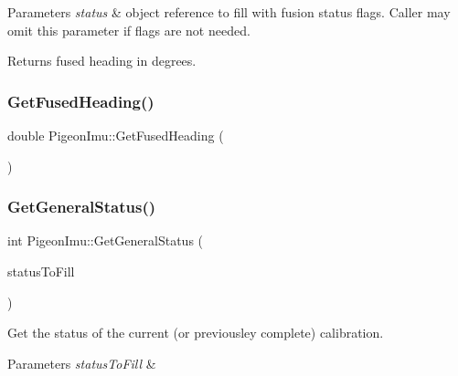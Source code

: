 \begin{DoxyParams}{Parameters}
{\em status} & object reference to fill with fusion status flags. Caller may omit this parameter if flags are not needed. \\
\hline
\end{DoxyParams}
\begin{DoxyReturn}{Returns}
fused heading in degrees. 
\end{DoxyReturn}
\mbox{\label{class_pigeon_imu_ab74361f2d6deab870df7b5eb41309380}} 
\subsubsection{\texorpdfstring{Get\+Fused\+Heading()}{GetFusedHeading()}\hspace{0.1cm}{\footnotesize\ttfamily [2/2]}}
{\footnotesize\ttfamily double Pigeon\+Imu\+::\+Get\+Fused\+Heading (\begin{DoxyParamCaption}{ }\end{DoxyParamCaption})}

\mbox{\label{class_pigeon_imu_aa27a78789526123878a66cccf426b904}} 
\subsubsection{\texorpdfstring{Get\+General\+Status()}{GetGeneralStatus()}}
{\footnotesize\ttfamily int Pigeon\+Imu\+::\+Get\+General\+Status (\begin{DoxyParamCaption}\item[{\hyperlink{struct_pigeon_imu_1_1_general_status}{Pigeon\+Imu\+::\+General\+Status} \&}]{status\+To\+Fill }\end{DoxyParamCaption})}

Get the status of the current (or previousley complete) calibration. 
\begin{DoxyParams}{Parameters}
{\em status\+To\+Fill} & \\
\hline
\end{DoxyParams}
\mbox{\label{class_pigeon_imu_acde1b893859cea0b5b2661f503f804ee}} 
